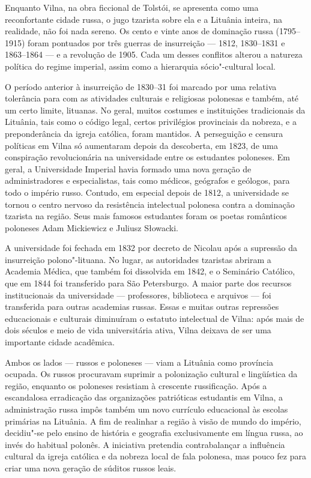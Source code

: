 Enquanto Vilna, na obra ficcional de Tolstói, se apresenta como uma
reconfortante cidade russa, o jugo tzarista sobre ela e a Lituânia
inteira, na realidade, não foi nada sereno. Os cento e vinte anos de
dominação russa (1795--1915) foram pontuados por três guerras de
insurreição --- 1812, 1830--1831 e 1863--1864 --- e a revolução de 1905. Cada
um desses conflitos alterou a natureza política do regime imperial,
assim como a hierarquia sócio"-cultural local.

O período anterior à insurreição de 1830--31 foi marcado por uma relativa
tolerância para com as atividades culturais e religiosas polonesas e
também, até um certo limite, lituanas. No geral, muitos costumes e
instituições tradicionais da Lituânia, tais como o código legal, certos
privilégios provinciais da nobreza, e a preponderância da igreja
católica, foram mantidos. A perseguição e censura políticas em Vilna só
aumentaram depois da descoberta, em 1823, de uma conspiração
revolucionária na universidade entre os estudantes poloneses. Em geral,
a Universidade Imperial havia formado uma nova geração de
administradores e especialistas, tais como médicos, geógrafos e
geólogos, para todo o império russo. Contudo, em especial depois de
1812, a universidade se tornou o centro nervoso da resistência
intelectual polonesa contra a dominação tzarista na região. Seus mais
famosos estudantes foram os poetas românticos poloneses Adam Mickiewicz
e Juliusz Słowacki.

A universidade foi fechada em 1832 por decreto de Nicolau  após a
supressão da insurreição polono"-lituana. No lugar, as autoridades
tzaristas abriram a Academia Médica, que também foi dissolvida em 1842,
e o Seminário Católico, que em 1844 foi transferido para São
Petersburgo. A maior parte dos recursos institucionais da universidade ---
professores, biblioteca e arquivos --- foi transferida para outras
academias russas. Essas e muitas outras repressões educacionais e
culturais diminuíram o estatuto intelectual de Vilna: após mais de dois
séculos e meio de vida universitária ativa, Vilna deixava de ser uma
importante cidade acadêmica.

Ambos os lados --- russos e poloneses --- viam a Lituânia como província
ocupada. Os russos procuravam suprimir a polonização cultural e
lingüística da região, enquanto os poloneses resistiam à crescente
russificação. Após a escandalosa erradicação das organizações
patrióticas estudantis em Vilna, a administração russa impôs também um
novo currículo educacional às escolas primárias na Lituânia. A fim de
realinhar a região à visão de mundo do império, decidiu"-se pelo ensino
de história e geografia exclusivamente em língua russa, ao invés do
habitual polonês. A iniciativa pretendia contrabalançar a influência
cultural da igreja católica e da nobreza local de fala polonesa, mas
pouco fez para criar uma nova geração de súditos russos leais.

